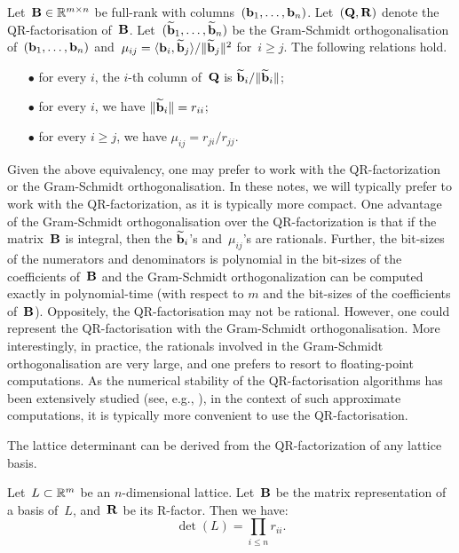 \begin{lemma}
Let~${\bf B} \in \mathbb{R}^{m \times n}$ be full-rank with columns~$({\bf b}_1,\ldots, {\bf b}_n)$. Let~$({\bf Q}, {\bf R})$ denote the QR-factorisation of~${\bf B}$.  Let~$(\widetilde{{\bf b}}_1, \ldots, \widetilde{{\bf b}}_n)$ be the Gram-Schmidt orthogonalisation of~$({\bf b}_1,\ldots, {\bf b}_n)$ and~$\mu_{ij} =  \langle{\bf b}_i,\widetilde{{\bf b}}_j\rangle / \|\widetilde{{\bf b}}_j\|^2$ for~$i \geq j$. The following relations hold.
\begin{itemize}
\item[$\bullet$] for every $i$, the $i$-th column of~${\bf Q}$ is $\widetilde{{\bf b}}_i / \|\widetilde{{\bf b}}_i\|$;
\item[$\bullet$] for every $i$, we have $\|\widetilde{{\bf b}}_i\| = r_{ii}$;
\item[$\bullet$] for every $i \geq j$, we have $\mu_{ij} = r_{ji}/r_{jj}$.
\end{itemize}
\end{lemma} 
 
Given the above equivalency, one may prefer to work with the QR-factorization or the Gram-Schmidt orthogonalisation. 
In these notes, we will typically prefer to work with the QR-factorization, as it is typically more compact. One advantage of the 
Gram-Schmidt orthogonalisation over the QR-factorization is that if the matrix~${\bf B}$ is integral, then the $\widetilde{{\bf b}}_i$'s 
and~$\mu_{ij}$'s are rationals. Further, the bit-sizes of the numerators and denominators is polynomial in the bit-sizes of the 
coefficients of~${\bf B}$ and the Gram-Schmidt orthogonalization can be computed exactly in polynomial-time 
(with respect to $m$ and  the bit-sizes of the coefficients of~${\bf B}$). Oppositely, the QR-factorisation may not be rational. 
However, one could represent the QR-factorisation with the Gram-Schmidt orthogonalisation. More interestingly, in practice, the 
rationals involved in the Gram-Schmidt orthogonalisation are very large, and one prefers to resort to floating-point computations. 
As the numerical stability of the QR-factorisation algorithms has been extensively studied (see, e.g., \cite{Higham02}), in the context 
of such approximate computations, it is typically more convenient to use the QR-factorisation. 

The lattice determinant can be derived from the QR-factorization of any lattice basis. 

\begin{lemma}
Let~$L \subset \mathbb{R}^m$ be an $n$-dimensional lattice. Let~${\bf B}$ be the matrix representation of a basis of~$L$, and~${\bf R}$ 
be its R-factor. Then we have:
\[\det(L) = \prod_{i \leq n} r_{ii}.\]
\end{lemma} 


